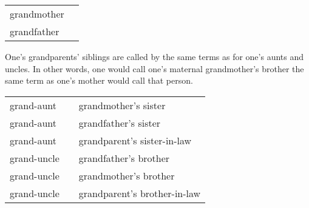 \exdisplay\noexno
\begin{tabu} {l l}
	grandmother & \\
	grandfather & \\
\end{tabu}
\xe

One's grandparents' siblings are called by the same terms as for one's aunts and uncles. In other words, one would call one's maternal grandmother's brother the same term as one's mother would call that person.

\exdisplay\noexno
\begin{tabu} {l l l}
	grand-aunt &  & grandmother's sister\\
	grand-aunt &  & grandfather's sister\\
	grand-aunt &  & grandparent's sister-in-law\\
	grand-uncle &  & grandfather's brother\\
	grand-uncle &  & grandmother's brother\\
	grand-uncle &  & grandparent's brother-in-law\\
\end{tabu}
\xe


